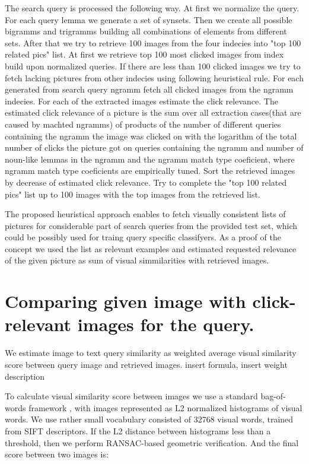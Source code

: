 \documentclass[11pt]{article} %
\begin{document}
The search query is processed the following way. At first we normalize the query. For each query lemma we generate a set of synsets\cite{NLTKSite}. Then we create all possible bigramms and trigramms building all combinations of elements from different sets. After that we try to retrieve 100 images from the four indecies into "top 100 related pics" list. At first we retrieve top 100 most clicked images from index build upon normalized queries. If there are less than 100 clicked images we try to fetch lacking pictures from other indecies using following heuristical rule. For each generated from search query ngramm fetch all clicked images from the ngramm indecies. For each  of the extracted images estimate the click relevance. The estimated click relevance of a picture is the sum over all extraction cases(that are caused by machted ngramms) of products of the number of different queries containing the ngramm the image was clicked on with the logarithm of the total number of clicks the picture got on queries containing the ngramm and number of noun-like lemmas in the ngramm and the ngramm match type coeficient, where ngramm match type coeficients are empirically tuned. Sort the retrieved images by decrease of estimated click relevance. Try  to complete the "top 100 related pics" list up to 100 images with the top images from the retrieved list.

The proposed heuristical approach enables to fetch visually consistent lists of  pictures for considerable part of search queries from the provided test set, which could be possibly used for traing query specific classifyers.  As a proof of the concept we used the list as relevant examples and estimated requested relevance of the given picture as sum of visual simmilarities with retrieved images.

\section{Comparing given image with click-relevant images for the query.}

We estimate image to text query similarity as weighted average visual
similarity score between query image and retrieved images. {insert formula, insert weight description}

To calculate visual similarity score between images we use a standard bag-of-words
framework \cite{Sivic03}, with images represented as L2 normalized histograms of
visual words. We use rather small vocabulary consisted of 32768 visual
words, trained from SIFT descriptors. If the L2 distance between
histograms less than a threshold, then we perform RANSAC-based
geometric verification. And the final score between two images is:
\end{document}
